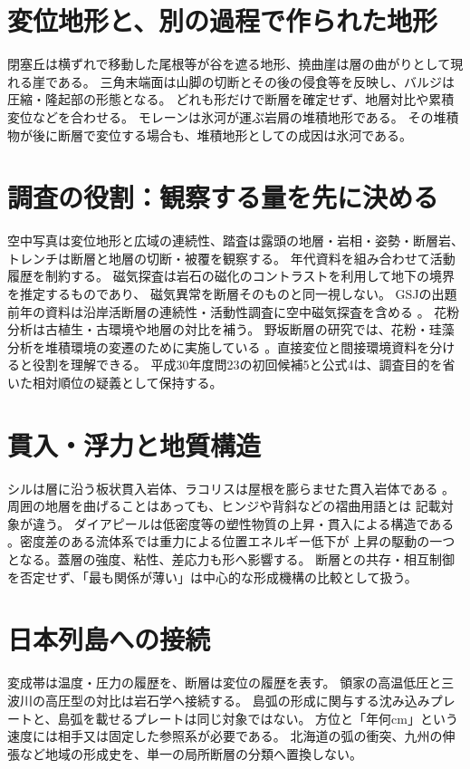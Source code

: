 \section{変位地形と、別の過程で作られた地形}
\label{theory:structure:landforms}
閉塞丘は横ずれで移動した尾根等が谷を遮る地形、撓曲崖は層の曲がりとして現れる崖である。
三角末端面は山脚の切断とその後の侵食等を反映し、バルジは圧縮・隆起部の形態となる。
どれも形だけで断層を確定せず、地層対比や累積変位などを合わせる。
モレーンは氷河が運ぶ岩屑の堆積地形である\cite{str_moraine}。
その堆積物が後に断層で変位する場合も、堆積地形としての成因は氷河である。

\section{調査の役割：観察する量を先に決める}
\label{theory:structure:survey}
空中写真は変位地形と広域の連続性、踏査は露頭の地層・岩相・姿勢・断層岩、
トレンチは断層と地層の切断・被覆を観察する。
年代資料を組み合わせて活動履歴を制約する。
磁気探査は岩石の磁化のコントラストを利用して地下の境界を推定するものであり、
磁気異常を断層そのものと同一視しない。
GSJの出題前年の資料は沿岸活断層の連続性・活動性調査に空中磁気探査を含める
\cite{str_coastal2017}。
花粉分析は古植生・古環境や地層の対比を補う。
野坂断層の研究では、花粉・珪藻分析を堆積環境の変遷のために実施している
\cite{str_pollen2014}。直接変位と間接環境資料を分けると役割を理解できる。
平成30年度問23の初回候補5と公式4は、調査目的を省いた相対順位の疑義として保持する。

\section{貫入・浮力と地質構造}
\label{theory:structure:intrusions}
シルは層に沿う板状貫入岩体、ラコリスは屋根を膨らませた貫入岩体である
\cite{str_intrusion}。周囲の地層を曲げることはあっても、ヒンジや背斜などの褶曲用語とは
記載対象が違う。
ダイアピールは低密度等の塑性物質の上昇・貫入による構造である
\cite{str_diapir}。密度差のある流体系では重力による位置エネルギー低下が
上昇の駆動の一つとなる。蓋層の強度、粘性、差応力も形へ影響する。
断層との共存・相互制御を否定せず、「最も関係が薄い」は中心的な形成機構の比較として扱う。

\section{日本列島への接続}
\label{theory:structure:japan}
変成帯は温度・圧力の履歴を、断層は変位の履歴を表す。
領家の高温低圧と三波川の高圧型の対比は岩石学へ接続する\cite{str_ryoke}。
島弧の形成に関与する沈み込みプレートと、島弧を載せるプレートは同じ対象ではない。
方位と「年何cm」という速度には相手又は固定した参照系が必要である。
北海道の弧の衝突、九州の伸張など地域の形成史を、単一の局所断層の分類へ置換しない。


